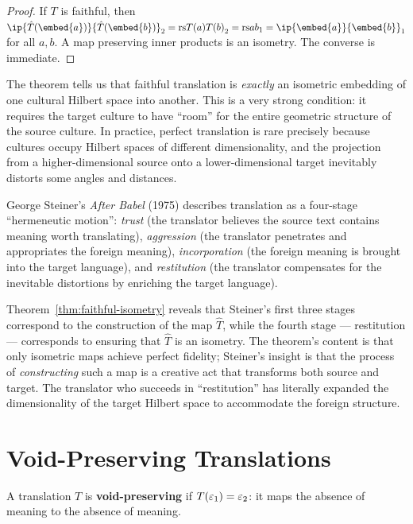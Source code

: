 \begin{proof}
If $T$ is faithful, then $\ip{\hat{T}(\embed{a})}{\hat{T}(\embed{b})}_2 =
\rs{T(a)}{T(b)}_2 = \rs{a}{b}_1 = \ip{\embed{a}}{\embed{b}}_1$ for all
$a, b$.  A map preserving inner products is an isometry.  The converse is
immediate.
\end{proof}

\begin{interpretation}
\label{interp:ch18:steiner_hermeneutic_motion}
The theorem tells us that faithful translation is \emph{exactly} an isometric
embedding of one cultural Hilbert space into another.  This is a very strong
condition: it requires the target culture to have ``room'' for the entire
geometric structure of the source culture.  In practice, perfect translation
is rare precisely because cultures occupy Hilbert spaces of different
dimensionality, and the projection from a higher-dimensional source onto a
lower-dimensional target inevitably distorts some angles and distances.

George Steiner's \textit{After Babel} (1975) describes translation as a
four-stage ``hermeneutic motion'': \emph{trust} (the translator believes the
source text contains meaning worth translating), \emph{aggression} (the
translator penetrates and appropriates the foreign meaning),
\emph{incorporation} (the foreign meaning is brought into the target language),
and \emph{restitution} (the translator compensates for the inevitable
distortions by enriching the target language).

Theorem~\ref{thm:faithful-isometry} reveals that Steiner's first three stages
correspond to the construction of the map $\hat{T}$, while the fourth stage
--- restitution --- corresponds to ensuring that $\hat{T}$ is an isometry.
The theorem's content is that only isometric maps achieve perfect fidelity;
Steiner's insight is that the process of \emph{constructing} such a map is
a creative act that transforms both source and target.  The translator who
succeeds in ``restitution'' has literally expanded the dimensionality of the
target Hilbert space to accommodate the foreign structure.
\end{interpretation}

\section{Void-Preserving Translations}

\begin{definition}
\label{def:void-preserving}
A translation $T$ is \textbf{void-preserving} if $T(\varepsilon_1) = \varepsilon_2$:
it maps the absence of meaning to the absence of meaning.
\end{definition}

